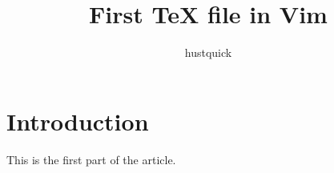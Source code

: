 \documentclass[16pt, twocolumn]{article}
\begin{document}
\title{First TeX file in Vim}
\author{hustquick}
\maketitle
	\section{Introduction}
	This is the first part of the article.
\end{document}
